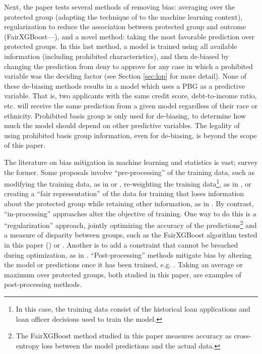 Next, the paper tests several methods of removing bias: averaging over the protected group (adapting the technique of  to the machine learning context), regularization to reduce the association between protected group and outcome (FairXGBoost---), and a novel method: taking the most favorable prediction over protected groups. In this last method, a model is trained using all available information (including prohibited characteristics), and then de-biased by changing the prediction from deny to approve for any case in which a prohibited variable was the deciding factor (see Section \ref{sec:lop} for more detail). None of these de-biasing methods results in a model which uses a PBG as a predictive variable. That is, two applicants with the same credit score, debt-to-income ratio, etc. will receive the same prediction from a given model regardless of their race or ethnicity. Prohibited basis group is only used for de-biasing, to determine how much the model should depend on other predictive variables. The legality of using prohibited basis group information, even for de-biasing, is beyond the scope of this paper. 

The literature on bias mitigation in machine learning and statistics is vast;  survey the former. Some proposals involve ``pre-processing'' of the training data, such as modifying the training data, as in  or , re-weighting the training data\footnote{In this case, the training data consist of the historical loan applications and loan officer decisions used to train the model.}, as in , or creating a ``fair representation'' of the data for training that loses information about the protected group while retaining other information, as in . By contrast, ``in-processing'' approaches alter the objective of training. One way to do this is a ``regularization'' approach, jointly optimizing the accuracy of the predictions\footnote{The FairXGBoost method studied in this paper measures accuracy as cross-entropy loss between the model predictions and the actual data.} and a measure of disparity between groups, such as the FairXGBoost algorithm tested in this paper () or . Another is to add a constraint that cannot be breached during optimization, as in . ``Post-processing'' methods mitigate bias by altering the model or predictions once it has been trained, e.g. . Taking an average or maximum over protected groups, both studied in this paper, are examples of post-processing methods. 

